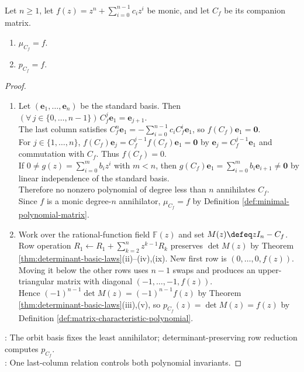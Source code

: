 \begin{theorem} \label{thm:companion-matrix-has-prescribed-minimal-polynomial} \\
Let $n\geq1$, let $f(z)=z^n+\sum\limits_{i=0}^{n-1}c_iz^i$ be monic, and let $C_f$ be its companion matrix.
\begin{enumerate}[label=(\roman*)]
\setlength{\itemsep}{0pt}
\item $\mu_{C_f}=f$.
\item $p_{C_f}=f$.
\end{enumerate}
\begin{proof}
\begin{enumerate}[label=(\roman*)]
\setlength{\itemsep}{0pt}
\item Let $(\mathbf{e}_1,\ldots,\mathbf{e}_n)$ be the standard basis. Then $(\forall\,j\in\{0,\ldots,n-1\})\,C_f^j\mathbf{e}_1=\mathbf{e}_{j+1}$.\\
The last column satisfies $C_f^n\mathbf{e}_1=-\sum\limits_{i=0}^{n-1}c_iC_f^i\mathbf{e}_1$, so $f(C_f)\mathbf{e}_1=\mathbf{0}$.\\
For $j\in\{1,\ldots,n\}$, $f(C_f)\mathbf{e}_j=C_f^{j-1}f(C_f)\mathbf{e}_1=\mathbf{0}$ by $\mathbf{e}_j=C_f^{j-1}\mathbf{e}_1$ and commutation with $C_f$. Thus $f(C_f)=0$.\\
If $0\neq g(z)=\sum\limits_{i=0}^{m}b_iz^i$ with $m<n$, then $g(C_f)\mathbf{e}_1=\sum\limits_{i=0}^{m}b_i\mathbf{e}_{i+1}\neq\mathbf{0}$ by linear independence of the standard basis.\\
Therefore no nonzero polynomial of degree less than $n$ annihilates $C_f$.\\
Since $f$ is a monic degree-$n$ annihilator, $\mu_{C_f}=f$ by Definition \ref{def:minimal-polynomial-matrix}.
\item Work over the rational-function field $\mathbb{F}(z)$ and set $M(z)\defeq zI_n-C_f$.\\
Row operation $R_1\leftarrow R_1+\sum\limits_{k=2}^{n}z^{k-1}R_k$ preserves $\det M(z)$ by Theorem \ref{thm:determinant-basic-laws}(ii)--(iv),(ix). New first row is $(0,\ldots,0,f(z))$.\\
Moving it below the other rows uses $n-1$ swaps and produces an upper-triangular matrix with diagonal $(-1,\ldots,-1,f(z))$.\\
Hence $(-1)^{n-1}\det M(z)=(-1)^{n-1}f(z)$ by Theorem \ref{thm:determinant-basic-laws}(iii),(v), so $p_{C_f}(z)=\det M(z)=f(z)$ by Definition \ref{def:matrix-characteristic-polynomial}.
\end{enumerate}
: The orbit basis fixes the least annihilator; determinant-preserving row reduction computes $p_{C_f}$.\\
: One last-column relation controls both polynomial invariants.
\end{proof}
\end{theorem}

